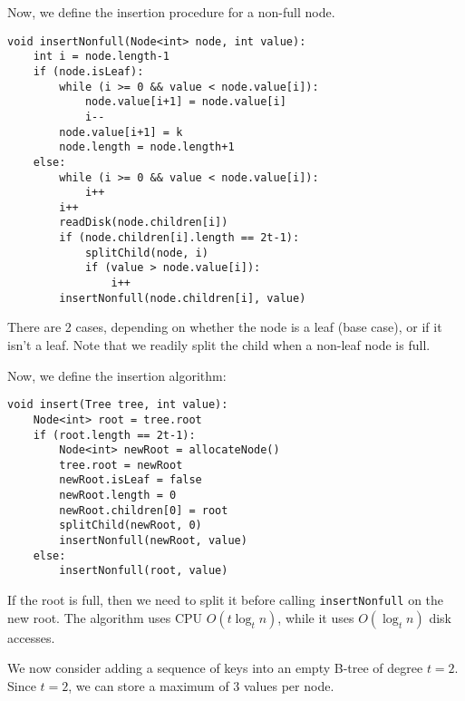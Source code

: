 \documentclass[a4paper, openany]{memoir}
\begin{document}
\noindent Now, we define the insertion procedure for a non-full node.
\begin{lstlisting}[language=pseudocode]
void insertNonfull(Node<int> node, int value):
    int i = node.length-1
    if (node.isLeaf):
        while (i >= 0 && value < node.value[i]):
            node.value[i+1] = node.value[i]
            i--
        node.value[i+1] = k
        node.length = node.length+1
    else:
        while (i >= 0 && value < node.value[i]):
            i++
        i++
        readDisk(node.children[i])
        if (node.children[i].length == 2t-1):
            splitChild(node, i)
            if (value > node.value[i]):
                i++
        insertNonfull(node.children[i], value)
\end{lstlisting}
There are 2 cases, depending on whether the node is a leaf (base case), or if it isn't a leaf. Note that we readily split the child when a non-leaf node is full.

\noindent Now, we define the insertion algorithm:
\begin{lstlisting}[language=pseudocode]
void insert(Tree tree, int value):
    Node<int> root = tree.root
    if (root.length == 2t-1):
        Node<int> newRoot = allocateNode()
        tree.root = newRoot
        newRoot.isLeaf = false
        newRoot.length = 0
        newRoot.children[0] = root
        splitChild(newRoot, 0)
        insertNonfull(newRoot, value)
    else:
        insertNonfull(root, value)
\end{lstlisting}
If the root is full, then we need to split it before calling \texttt{insertNonfull} on the new root. The algorithm uses CPU $O(t \log_t n)$, while it uses $O(\log_t n)$ disk accesses.

\noindent We now consider adding a sequence of keys into an empty B-tree of degree $t = 2$. Since $t = 2$, we can store a maximum of 3 values per node.
\end{document}
